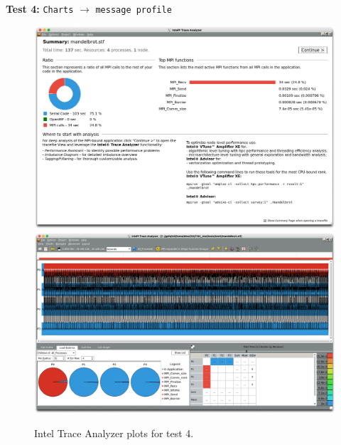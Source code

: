\documentclass[a4paper,titlepage]{article}
\begin{document}
\noindent
\textbf{Test 4:}  \texttt{Charts} $\rightarrow$ \texttt{message profile}
\begin{figure}[htbp]
\begin{center}
\includegraphics[scale=0.3]{figures/test4_summary}
\includegraphics[scale=0.3]{figures/test4_eventTimeline}
\caption{Intel Trace Analyzer plots for test 4.}
\label{fig:test4_ITAC_summary}
\end{center}
\end{figure}
\end{document}
